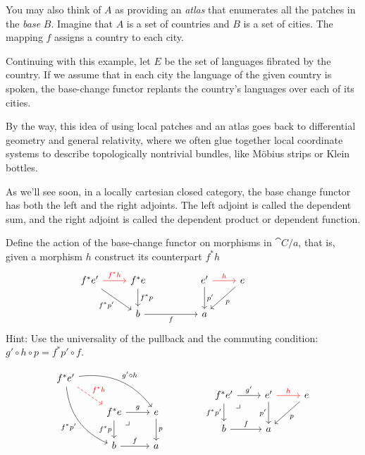 \documentclass[DaoFP]{subfiles}
\begin{document}
You may also think of $A$ as providing an \emph{atlas} that enumerates all the patches in the \emph{base} $B$. Imagine that $A$ is a set of countries and $B$ is a set of cities. The mapping $f$ assigns a country to each city.

Continuing with this example, let $E$ be the set of languages fibrated by the country. If we assume that in each city the language of the given country is spoken, the base-change functor replants the country's languages over each of its cities.

By the way, this idea of using local patches and an atlas goes back to differential geometry and general relativity, where we often glue together local coordinate systems to describe topologically nontrivial bundles, like M\"{o}bius strips or Klein bottles.

As we'll see soon, in a locally cartesian closed category, the base change functor has both the left and the right adjoints. The left adjoint is called the dependent sum, and the right adjoint is called the dependent product or dependent function. 

\begin{exercise}
Define the action of the base-change functor on morphisms in $\cat C/a$, that is, given a morphism $h$ construct its counterpart $f^* h$
\[
 \begin{tikzcd}
f^* e'
 \arrow[dr, "f^*p'"']
 \arrow[r, red, "f^* h"]
 & f^* e
\arrow[d, "f^*p"]
&& e'
\arrow[d, "p'"]
\arrow[r, red, "h"]
& e
\arrow[dl, "p"]
 \\
& b
\arrow[rr, "f"']
 &&a
\end{tikzcd}
\hspace{40pt}
\begin{tikzcd}
\end{tikzcd}
\]
Hint: Use the universality of the pullback and the commuting condition: $g' \circ h \circ p = f^* p' \circ f$.

\[
\begin{tikzcd}
 f^* e'
 \arrow[dr, dashed, red, "f^* h"]
 \arrow[drr, bend left, "g' \circ h"]
 \arrow[ddr, bend right, "f^* p'"']
 \\
 &f^* e
 \arrow[r, "g"]
 \arrow[d, "f^* p"']
\arrow[dr, phantom,  , very near start, "\lrcorner"]
 &e
 \arrow[d, "p"]
 \\
 &b
 \arrow[r, "f"]
 &a
\end{tikzcd}
\hspace{40pt}
\begin{tikzcd}
f^* e'
\arrow[r, "g'"]
\arrow[d, "f^* p'"']
\arrow[dr, phantom,  , very near start, "\lrcorner"]
& e'
\arrow[d, "p'"']
\arrow[r, red, "h"]
& e
\arrow[dl, "p"]
\\
b
\arrow[r, "f"]
& a
\end{tikzcd}
\]


\end{exercise}
\end{document}
